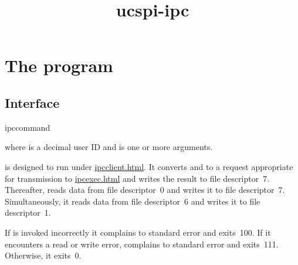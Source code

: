 \documentclass{book}
\title{ucspi-ipc}
\begin{document}
\section{The  program}

\subsection{Interface}
\begin{code}%
  ipccommand  
\end{code}
where  is a decimal user ID and  is one or more arguments.

 is designed to run under
\href{\cmd{ipcclient}}{ipcclient.html}.  It converts  and 
to a request appropriate for transmission to \href{\cmd{ipcexec}}{ipcexec.html}
and writes the result to file descriptor~7.  Thereafter,  reads
data from file descriptor~0 and writes it to file descriptor~7.  Simultaneously,
it reads data from file descriptor~6 and writes it to file descriptor~1.

If  is invoked incorrectly it complains to standard error and
exits~100.  If it encounters a read or write error,  complains
to standard error and exits~111.  Otherwise, it exits~0.
\end{document}
